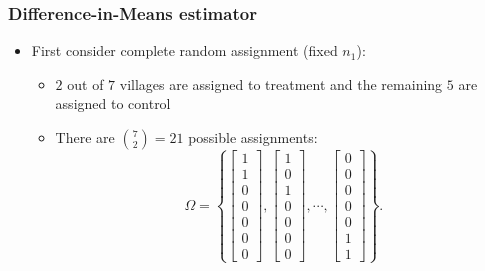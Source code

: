 \documentclass[table, xcolor={dvipsnames}, 9pt]{beamer}
\theoremstyle{newstyle}
\begin{document}
\begin{frame}
\frametitle{Difference-in-Means estimator} 
\begin{itemize}
\item First consider complete random assignment (fixed $n_1$): 
\begin{itemize}
\item $2$ out of $7$ villages are assigned to treatment and the remaining $5$ are assigned to control
\item There are $\binom{7}{2} = 21$ possible assignments:
\begin{equation*}
  \Omega =
  \left\{
    \begin{bmatrix} 1 \\ 1 \\ 0 \\ 0 \\ 0 \\ 0 \\ 0 \end{bmatrix},
    \begin{bmatrix} 1 \\ 0 \\ 1 \\ 0 \\ 0 \\ 0 \\ 0 \end{bmatrix},
    \cdots ,
    \begin{bmatrix} 0 \\ 0 \\ 0 \\ 0 \\ 0 \\ 1 \\ 1 \end{bmatrix}
  \right\}.
\end{equation*}
\end{itemize}
\end{itemize}
\end{frame}
\end{document}
